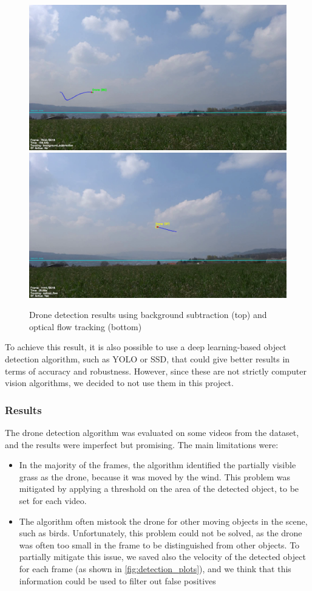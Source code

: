 \documentclass[11pt]{article}
\begin{document}
\begin{figure}[h]
    \centering
    \includegraphics[width=.6\textwidth]{imgs/drone_detection_bs.png}
    \includegraphics[width=.6\textwidth]{imgs/drone_detection_of.png}
    \caption{Drone detection results using background subtraction (top) and optical flow tracking (bottom)}
    \label{fig:drone_detection}
\end{figure}

{\color{red} To achieve this result, it is also possible to use a deep learning-based object detection algorithm, such as YOLO or SSD, that could give better results in terms of accuracy and robustness. However, since these are not strictly computer vision algorithms, we decided to not use them in this project.}

\subsubsection*{Results}
\label{sec:drone_detection_results}

The drone detection algorithm was evaluated on some videos from the dataset, and the results were imperfect but promising. The main limitations were:

\begin{itemize}
    \item In the majority of the frames, the algorithm identified the partially visible grass as the drone, because it was moved by the wind. This problem was mitigated by applying a threshold on the area of the detected object, to be set for each video.
    \item The algorithm often mistook the drone for other moving objects in the scene, such as birds. Unfortunately, this problem could not be solved, as the drone was often too small in the frame to be distinguished from other objects. To partially mitigate this issue, we saved also the velocity of the detected object for each frame (as shown in \ref{fig:detection_plots}), and we think that this information could be used to filter out false positives
\end{itemize}
\end{document}
